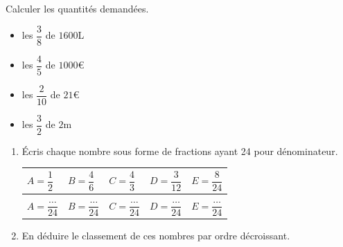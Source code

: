 \documentclass[a4paper]{book}
\begin{document}
    \begin{exercice}
        Calculer les quantités demandées.

        \begin{minipage}{0.45\linewidth}
            \begin{itemize}
                \item les $\dfrac{3}{8}$ de $1600$L

                \vspace{0.5cm}
                
                \item les $\dfrac{4}{5}$ de $1000$€

                \vspace{0.5cm}
            \end{itemize}
        \end{minipage}  
        \hfill\vline\hfill
        \begin{minipage}{0.45\linewidth}
            \begin{itemize}
                \item les $\dfrac{2}{10}$ de $21$€
                
                \vspace{0.5cm}
                
                \item les $\dfrac{3}{2}$ de $2$m

                \vspace{0.5cm}
            \end{itemize}
        \end{minipage}
    \end{exercice}


    \begin{exercice}
        \begin{enumerate}
            \item Écris chaque nombre sous forme de fractions ayant 24 pour dénominateur.

            \begin{center}
                \begin{tabular}{p{2cm}|p{2cm}|p{2cm}|p{2cm}|p{2cm}}
                    $A = \dfrac{1}{2}$ & $B = \dfrac{4}{6}$ & $C = \dfrac{4}{3}$ & $D = \dfrac{3}{12}$ & $E = \dfrac{8}{24}$ \\[1ex] \hline

                    & & & & \\
                    $A = \dfrac{\dots}{24}$ & $B = \dfrac{\dots}{24}$ & $C = \dfrac{\dots}{24}$ & $D = \dfrac{\dots}{24}$ & $E = \dfrac{\dots}{24}$ 
                \end{tabular}
            \end{center}

            \item En déduire le classement de ces nombres par ordre décroissant.
        \end{enumerate}   
    \end{exercice}
\end{document}
